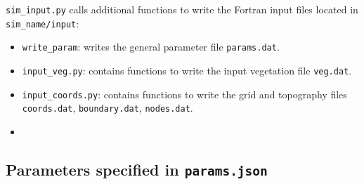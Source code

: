 \documentclass{article}
\newcommand{\code}[1]{\texttt{#1}}
\begin{document}
\code{sim\_input.py} calls additional functions to write the Fortran input files located in \code{sim\_name/input}:
\begin{itemize}
	\item \code{write\_param}: writes the general parameter file  \code{params.dat}.
	\item \code{input\_veg.py}: contains functions to write the input vegetation file \code{veg.dat}.
	\item \code{input\_coords.py}: contains functions to write the  grid and topography files \code{coords.dat}, \code{boundary.dat}, \code{nodes.dat}. 
	\item \end{itemize}


\subsection{Parameters specified in \code{params.json} }
\end{document}
